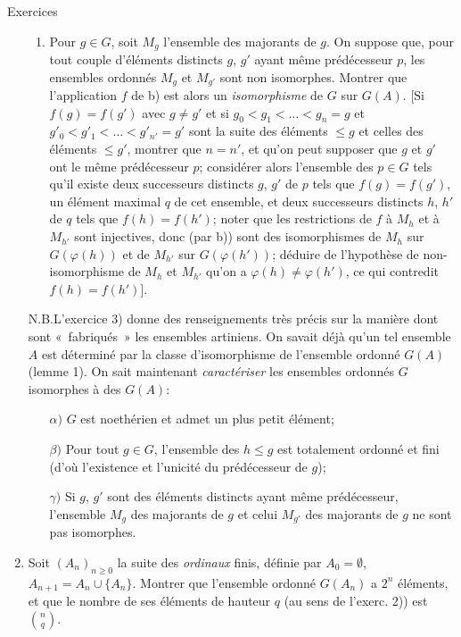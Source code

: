 \documentclass[10pt]{../fichiers-configuration-latex/smfart}
\begin{document}
\begin{enonce*}[remark]{Exercices}
\begin{enumerate}
\begin{enumerate}
\item Pour $g\in G$, soit $M_g$ l'ensemble des majorants de $g$. On
suppose que, pour tout couple d'éléments distincts $g$, $g'$ ayant
même prédécesseur $p$, les ensembles ordonnés $M_g$ et
$M_{g'}$ sont
non isomorphes. Montrer que l'application $f$ de b) est alors un
\emph{isomorphisme} de $G$ sur $G(A)$. [Si $f(g)=f(g')$ avec $g\neq
g'$ et si $g_0<g_1<\ldots<g_n=g$ et $g'_0<g'_1<\ldots <g'_{n'}=g'$
sont la suite des éléments $\leq g$ et celles des
éléments $\leq
g'$, montrer que $n=n'$, et qu'on peut supposer que $g$ et $g'$ ont
le même prédécesseur $p$; considérer alors l'ensemble
des $p\in G$
tels qu'il existe deux successeurs distincts $g$, $g'$ de $p$ tels
que $f(g)=f(g')$, un élément maximal $q$ de cet ensemble, et deux
successeurs distincts $h$, $h'$ de $q$ tels que $f(h)=f(h')$; noter
que les restrictions de $f$ à $M_h$ et à $M_{h'}$ sont injectives,
donc (par b)) sont des isomorphismes de $M_h$ sur $G(\varphi(h))$ et
de $M_{h'}$ sur $G(\varphi(h'))$; déduire de l'hypothèse de
non-isomorphisme de $M_h$ et $M_{h'}$ qu'on a $\varphi(h)\neq
\varphi(h')$, ce qui contredit $f(h)=f(h')$].
\end{enumerate}
N.B.\pageoriginale L'exercice 3) donne des renseignements très
précis sur la manière dont sont « fabriqués » les ensembles
artiniens. On savait déjà qu'un tel ensemble $A$ est
déterminé par
la classe d'isomorphisme de l'ensemble ordonné $G(A)$ (lemme 1). On
sait maintenant \emph{caractériser} les ensembles ordonnés $G$
isomorphes à des $G(A)$:
\begin{itemize}
\item[$\alpha)$] $G$ est noethérien et admet un plus petit
élément;

\item[$\beta)$] Pour tout $g\in G$, l'ensemble des $h\leq g$ est
totalement ordonné et fini (d'où l'existence et l'unicité du
prédécesseur de $g$);

\item[$\gamma)$] Si $g$, $g'$ sont des éléments distincts ayant
même prédécesseur, l'ensemble $M_g$ des majorants de $g$ et celui
$M_{g'}$ des majorants de $g$ ne sont pas isomorphes.
\end{itemize}

\item Soit $(A_n)_{n\geq 0}$ la suite des \emph{ordinaux} finis,
définie par $A_0=∅$, $A_{n+1}=A_n\cup \{A_n\}$. Montrer
que l'ensemble ordonné $G(A_n)$ a $2^n$ éléments, et que le nombre
de ses éléments de hauteur $q$ (au sens de l'exerc. 2)) est
$\binom{n}{q}$.
\end{enumerate}
\end{enonce*}

\begin{thebibliography}{10}%
 
\end{thebibliography}

\ifx\danslelivre\undefined
%
%
\end{document}
